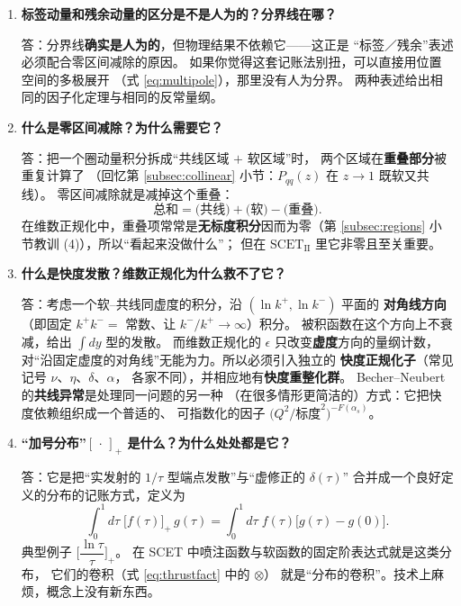 \documentclass[UTF8,a4paper,11pt]{ctexart}
\theoremstyle{definition}
\theoremstyle{remark}
\theoremstyle{plain}
\newcommand{\as}{\alpha_s}
\newcommand{\SCETII}{\text{SCET}_{\mathrm{II}}}
\begin{document}
\begin{enumerate}[label=\textbf{Q\arabic*.}, leftmargin=1.3cm]
答：不会。它来自积掉小分量场 $\eta_n$（式 \eqref{eq:etasol}），
物理上代表沿 $\bar n$ 方向的\textbf{离壳}传播——离壳的东西传播距离
$\sim1/(\bar n\cdot p)\sim1/Q$，在 EFT 的分辨率下就是“瞬时”的。
非局域性只沿\textbf{光锥方向}，且被 $1/Q$ 压低。
这与 Fermi 理论中 $1/M_W^2$ 展开留下局域算符是同一回事，
只不过这里“展开的方向”是横向／虚度方向，光锥方向保持完整
（见第 \ref{subsec:organization} 小节的注）。

\item \textbf{标签动量和残余动量的区分是不是人为的？分界线在哪？}

答：分界线\textbf{确实是人为的}，但物理结果不依赖它——这正是
“标签／残余”表述必须配合零区间减除的原因。
如果你觉得这套记账法别扭，可以直接用位置空间的多极展开
（式 \eqref{eq:multipole}），那里没有人为分界。
两种表述给出相同的因子化定理与相同的反常量纲。

\item \textbf{什么是零区间减除？为什么需要它？}

答：把一个圈动量积分拆成“共线区域 $+$ 软区域”时，
两个区域在\textbf{重叠部分}被重复计算了
（回忆第 \ref{subsec:collinear} 小节：$P_{qq}(z)$ 在 $z\to1$ 既软又共线）。
零区间减除就是减掉这个重叠：
\begin{equation}
  \text{总和}=\big(\text{共线}\big)+\big(\text{软}\big)-\big(\text{重叠}\big).
\end{equation}
在维数正规化中，重叠项常常是\textbf{无标度积分}因而为零（第
\ref{subsec:regions} 小节教训 (4)），所以“看起来没做什么”；
但在 $\SCETII$ 里它非零且至关重要。

\item \textbf{什么是快度发散？维数正规化为什么救不了它？}

答：考虑一个软--共线同虚度的积分，沿 $(\ln k^+,\ln k^-)$ 平面的
\textbf{对角线方向}（即固定 $k^+k^-=$ 常数、让 $k^-/k^+\to\infty$）积分。
被积函数在这个方向上不衰减，给出 $\int dy$ 型的发散。
而维数正规化的 $\epsilon$ 只改变\textbf{虚度}方向的量纲计数，
对“沿固定虚度的对角线”无能为力。所以必须引入独立的
\textbf{快度正规化子}（常见记号 $\nu$、$\eta$、$\delta$、$\alpha$，
各家不同），并相应地有\textbf{快度重整化群}。
Becher--Neubert 的\textbf{共线异常}是处理同一问题的另一种
（在很多情形更简洁的）方式：它把快度依赖组织成一个普适的、
可指数化的因子 $\big(Q^2/\text{标度}^2\big)^{-F(\as)}$。

\item \label{item:plusdist} \textbf{“加号分布”$[\,\cdot\,]_+$ 是什么？为什么处处都是它？}

答：它是把“实发射的 $1/\tau$ 型端点发散”与“虚修正的 $\delta(\tau)$”
合并成一个良好定义的分布的记账方式，定义为
\begin{equation}
  \int_0^1\! d\tau\;\big[f(\tau)\big]_+\,g(\tau)
  =\int_0^1\! d\tau\; f(\tau)\big[g(\tau)-g(0)\big] .
\end{equation}
典型例子 $\Big[\dfrac{\ln\tau}{\tau}\Big]_+$。
在 SCET 中喷注函数与软函数的固定阶表达式就是这类分布，
它们的卷积（式 \eqref{eq:thrustfact} 中的 $\otimes$）
就是“分布的卷积”。技术上麻烦，概念上没有新东西。


\end{enumerate}
\end{document}
